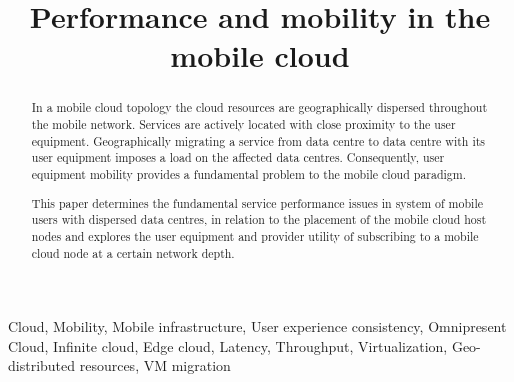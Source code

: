 \documentclass[conference]{IEEEtran}
\newcommand{\xcloud}{mobile cloud}
\newcommand{\ue}{user equipment}
\newcommand{\dc}{data centre}
\newcommand{\dcs}{data centres}
\begin{document}
\title{Performance and mobility in the \xcloud}

\author{
\and
{}
}

\maketitle

\begin{abstract}
In a \xcloud{} topology the cloud resources are geographically dispersed throughout the mobile network. Services are actively located with close proximity to the \ue. Geographically migrating a service from \dc{} to \dc{} with its \ue{} imposes a load on the affected \dcs. Consequently, \ue{} mobility provides a fundamental problem to the \xcloud{} paradigm.

This paper determines the fundamental service performance issues in system of mobile users with dispersed \dcs{}, in relation to the placement of the \xcloud{} host nodes and explores the \ue{} and provider utility of subscribing to a \xcloud{} node at a certain network depth.
\end{abstract}

\begin{keywords} 
Cloud, Mobility, Mobile infrastructure, User experience consistency, Omnipresent Cloud, Infinite cloud, Edge cloud, Latency, Throughput, Virtualization, Geo-distributed resources, VM migration
\end{keywords} 

\IEEEpeerreviewmaketitle






\end{document}
